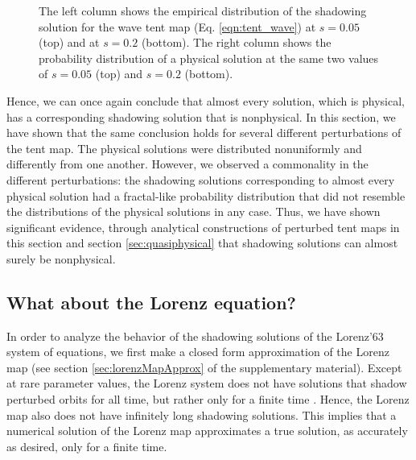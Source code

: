 \documentclass[preprint,12pt]{elsarticle}
\begin{document}
\begin{figure}
    \caption{The left column shows the empirical distribution of the shadowing solution for the wave tent map (Eq. \ref{eqn:tent_wave}) at $s=0.05$ (top) and at $s=0.2$ (bottom). The right column shows the probability distribution of a physical solution at the same two values of $s = 0.05$ (top) and $s = 0.2$ (bottom).}
    \label{fig:tent_wave_shadow}
\end{figure}
Hence, we can once again conclude that almost every solution, which is physical, 
has a corresponding shadowing solution that is nonphysical. In this section,
we have shown that the same conclusion holds for several different perturbations 
of the tent map. The physical solutions were distributed nonuniformly 
and differently from one another. However, we observed a commonality in the different perturbations: the shadowing solutions corresponding to almost every physical solution had a fractal-like probability distribution that did not resemble the distributions of the physical solutions in any case. Thus, we have shown significant evidence, through analytical constructions of perturbed tent maps in this section and 
section \ref{sec:quasiphysical} that shadowing solutions can almost surely be nonphysical.

\subsection{What about the Lorenz equation?}
In order to analyze the behavior of the shadowing solutions of the Lorenz'63 system 
of equations, we first make a closed form approximation of the Lorenz map (see section \ref{sec:lorenzMapApprox} of the supplementary material). Except at rare parameter values, the Lorenz system does not have 
solutions that shadow perturbed orbits for all time, but rather only for a finite time 
\cite{lorenzPOTP}. Hence, the Lorenz map also does not have infinitely long shadowing solutions. This implies that a numerical solution of the Lorenz map approximates 
a true solution, as accurately as desired, only for a finite time.
\end{document}
